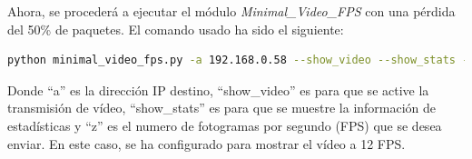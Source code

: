 \newpage

Ahora, se procederá a ejecutar el módulo \textit{Minimal\_Video\_FPS} con una pérdida del 50\% de paquetes. El comando usado ha sido el siguiente:

\begin{lstlisting}[language=bash, basicstyle=\ttfamily\scriptsize]
    python minimal_video_fps.py -a 192.168.0.58 --show_video --show_stats -z 12
\end{lstlisting}
Donde ``a'' es la dirección IP destino, ``show\_video'' es para que se active la transmisión de vídeo, ``show\_stats'' es para que se muestre la información de estadísticas y ``z'' es el numero de fotogramas por segundo (FPS) que se desea enviar. En este caso, se ha configurado para mostrar el vídeo a 12 FPS.
\vspace{\baselineskip}


